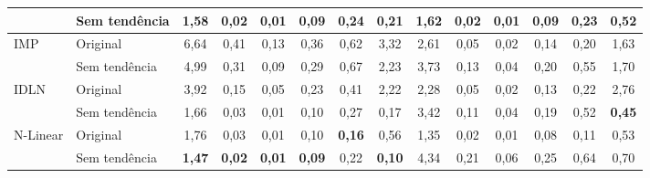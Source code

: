 \begin{tabular}{llcccccccccccc}
	                                    & Sem tendência                                   & 1,58                                                           & 0,02          & 0,01          & 0,09          & 0,24          & 0,21          & 1,62          & 0,02          & 0,01          & 0,09          & 0,23          & 0,52          \\
	\midrule
	\multirow{2}{*}{\ac{IMP}}
	                                    & Original                                        & 6,64                                                           & 0,41          & 0,13          & 0,36          & 0,62          & 3,32          & 2,61          & 0,05          & 0,02          & 0,14          & 0,20          & 1,63          \\
	                                    & Sem tendência                                   & 4,99                                                           & 0,31          & 0,09          & 0,29          & 0,67          & 2,23          & 3,73          & 0,13          & 0,04          & 0,20          & 0,55          & 1,70          \\
	\midrule
	\multirow{2}{*}{\ac{IDLN}}
	                                    & Original                                        & 3,92                                                           & 0,15          & 0,05          & 0,23          & 0,41          & 2,22          & 2,28          & 0,05          & 0,02          & 0,13          & 0,22          & 2,76          \\
	                                    & Sem tendência                                   & 1,66                                                           & 0,03          & 0,01          & 0,10          & 0,27          & 0,17          & 3,42          & 0,11          & 0,04          & 0,19          & 0,52          & \textbf{0,45} \\
	\midrule
	\multirow{2}{*}{\ac{N-Linear}}
	                                    & Original                                        & 1,76                                                           & 0,03          & 0,01          & 0,10          & \textbf{0,16} & 0,56          & 1,35          & 0,02          & 0,01          & 0,08          & 0,11          & 0,53          \\
	                                    & Sem tendência                                   & \textbf{1,47}                                                  & \textbf{0,02} & \textbf{0,01} & \textbf{0,09} & 0,22          & \textbf{0,10} & 4,34          & 0,21          & 0,06          & 0,25          & 0,64          & 0,70          \\

\end{tabular}
